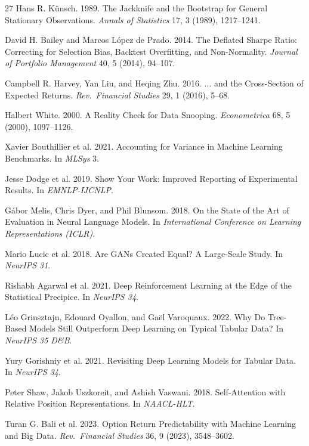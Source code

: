 \documentclass[sigconf,review,anonymous]{acmart}
\begin{document}
\begin{thebibliography}{27}
Hans R. K\"unsch. 1989. The Jackknife and the Bootstrap for General Stationary Observations. \textit{Annals of Statistics} 17, 3 (1989), 1217--1241.

David H. Bailey and Marcos L\'opez de Prado. 2014. The Deflated Sharpe Ratio: Correcting for Selection Bias, Backtest Overfitting, and Non-Normality. \textit{Journal of Portfolio Management} 40, 5 (2014), 94--107.

Campbell R. Harvey, Yan Liu, and Heqing Zhu. 2016. $\ldots$ and the Cross-Section of Expected Returns. \textit{Rev.\ Financial Studies} 29, 1 (2016), 5--68.

Halbert White. 2000. A Reality Check for Data Snooping. \textit{Econometrica} 68, 5 (2000), 1097--1126.

Xavier Bouthillier et al. 2021. Accounting for Variance in Machine Learning Benchmarks. In \textit{MLSys} 3.

Jesse Dodge et al. 2019. Show Your Work: Improved Reporting of Experimental Results. In \textit{EMNLP-IJCNLP}.

G\'abor Melis, Chris Dyer, and Phil Blunsom. 2018. On the State of the Art of Evaluation in Neural Language Models. In \textit{International Conference on Learning Representations (ICLR)}.

Mario Lucic et al. 2018. Are GANs Created Equal? A Large-Scale Study. In \textit{NeurIPS 31}.

Rishabh Agarwal et al. 2021. Deep Reinforcement Learning at the Edge of the Statistical Precipice. In \textit{NeurIPS 34}.

L\'eo Grinsztajn, Edouard Oyallon, and Ga\"el Varoquaux. 2022. Why Do Tree-Based Models Still Outperform Deep Learning on Typical Tabular Data? In \textit{NeurIPS 35 D\&B}.

Yury Gorishniy et al. 2021. Revisiting Deep Learning Models for Tabular Data. In \textit{NeurIPS 34}.

Peter Shaw, Jakob Uszkoreit, and Ashish Vaswani. 2018. Self-Attention with Relative Position Representations. In \textit{NAACL-HLT}.

Turan G. Bali et al. 2023. Option Return Predictability with Machine Learning and Big Data. \textit{Rev.\ Financial Studies} 36, 9 (2023), 3548--3602.

\end{thebibliography}
\endgroup
\end{document}
